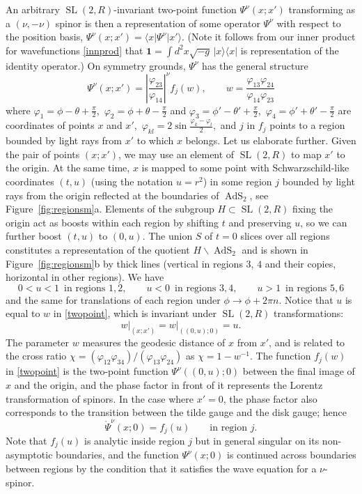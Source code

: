 \documentclass[11pt]{article}
\newcommand{\be}{\begin{equation}}
\newcommand{\ee}{\end{equation}}
\newcommand{\lt}{\left}
\newcommand{\rt}{\right}
\newcommand*{\bra}[1]{\langle{#1}|}
\newcommand*{\ket}[1]{|{#1}\rangle}
\newcommand{\vp}{\varphi}
\newcommand{\RR}{\mathbb{R}}
\DeclareMathOperator{\tSL}{\widetilde{\mathrm{SL}}}
\DeclareMathOperator{\tAdS}{\widetilde{AdS}}
\newcommand{\unit}{\mathbf{1}}
\newcommand{\rPsi}{\mathring{\Psi}}
\def\widetilde#1{#1}%
\def\RR{R}
\begin{document}
An arbitrary $\tSL(2,\RR)$-invariant two-point function $\Psi^{\nu}(x; x')$ transforming as a $(\nu, -\nu)$ spinor is then a representation of some operator $\Psi^{\nu}$ with respect to the position basis, $\Psi^{\nu}(x; x')=\bra{x}{\Psi^{\nu}\ket{x'}}$. (Note it follows from our inner product for wavefunctions \eqref{innprod} that $\unit=\int d^2x \sqrt{-g}\,\ket{x}\bra{x}$ is representation of the identity operator.) On symmetry grounds, $\Psi^{\nu}$ has the general structure
\be \label{twopoint}
\Psi^{\nu}(x;x')=\left|\frac{\vp_{23}}{\vp_{14}}\right|^{\nu}f_{j}(w),\qquad
w=\frac{\vp_{13}\vp_{24}}{\vp_{14}\vp_{23}}
\ee
where $\vp_1=\phi-\theta+\frac{\pi}{2}$,\, $\vp_2=\phi+\theta-\frac{\pi}{2}$ and $\vp_3=\phi'-\theta'+\frac{\pi}{2}$,\, $\vp_4=\phi'+\theta'-\frac{\pi}{2}$ are coordinates of points $x$ and $x'$,\, $\vp_{kl}=2\sin\frac{\vp_k-\vp_l}{2}$,\, and $j$ in $f_j$ points to a region bounded by light rays from $x'$ to which $x$ belongs. Let us elaborate further. Given the pair of points $(x;x')$, we may use an element of $\tSL(2,\RR)$ to map $x'$ to the origin. At the same time, $x$ is mapped to some point with Schwarzschild-like coordinates $(t,u)$ (using the notation $u=r^2$) in some region $j$ bounded by light rays from the origin reflected at the boundaries of $\tAdS_2$, see Figure~\ref{fig:regionsm}a. Elements of the subgroup $H \subset \tSL(2,\RR)$ fixing the origin act as boosts within each region by shifting $t$ and preserving $u$, so we can further boost $(t,u)$ to $(0,u)$. The union $S$ of $t=0$ slices over all regions constitutes a representation of the quotient $H\backslash \tAdS_2$ and is shown in Figure~\ref{fig:regionsm}b by thick lines (vertical in regions $3$, $4$ and their copies, horizontal in other regions). We have
\be \label{urange}
0<u<1\, \text{ in regions }1,2,\qquad
u<0\, \text{ in regions }3,4,\qquad
u>1\, \text{ in regions }5,6
\ee
and the same for translations of each region under $\phi \to \phi+2\pi n$. Notice that $u$ is equal to $w$ in \eqref{twopoint}, which is invariant under $\tSL(2,\RR)$ transformations:
\begin{equation} \label{wurel}
\lt. w \rt|_{(x;x')}=\lt. w \rt |_{((0,u);0)}=u.
\end{equation}
The parameter $w$ measures the geodesic distance of $x$ from $x'$, and is related to the cross ratio $\chi=(\vp_{12}\vp_{34})/(\vp_{13}\vp_{24})$ as $\chi=1-w^{-1}$. The function $f_j(w)$ in \eqref{twopoint} is the two-point function $\Psi^{\nu}((0,u);0)$ between the final image of $x$ and the origin, and the phase factor in front of it represents the Lorentz transformation of spinors. In the case where $x'=0$, the phase factor also corresponds to the transition between the tilde gauge and the disk gauge; hence 
\begin{equation}
\rPsi^{\nu}(x;0)=f_j(u)\qquad \text{in region }j.
\end{equation}
Note that $f_j(u)$ is analytic inside region $j$ but in general singular on its non-asymptotic boundaries, and the function $\Psi^{\nu}(x;0)$ is continued across boundaries between regions by the condition that it satisfies the wave equation for a $\nu$-spinor. 
\end{document}
